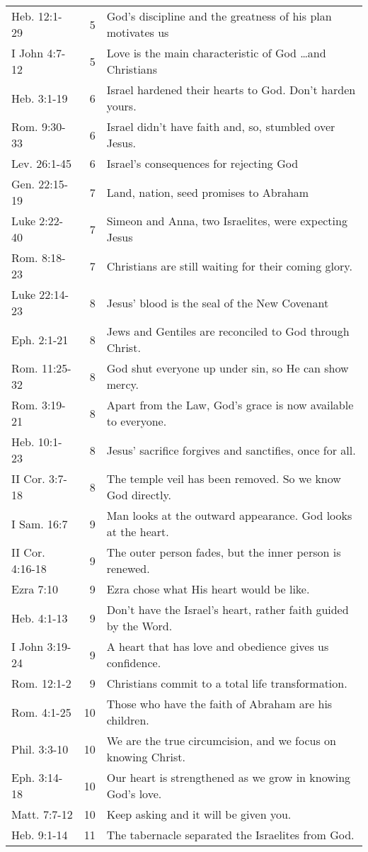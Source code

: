\begin{table}[h]
\begin{tabular}{lrp{11cm}}
Heb. 12:1-29    & 5  & God's discipline and the greatness of his plan motivates us\\
I John 4:7-12   & 5  & Love is the main characteristic of God \ldots and Christians\\
Heb. 3:1-19     & 6  & Israel hardened their hearts to God.  Don't harden yours.\\
Rom. 9:30-33    & 6  & Israel didn't have faith and, so, stumbled over Jesus.\\
Lev. 26:1-45    & 6  & Israel's consequences for rejecting God\\
Gen. 22:15-19   & 7  & Land, nation, seed promises to Abraham\\
Luke 2:22-40    & 7  & Simeon and Anna, two Israelites, were expecting Jesus\\
Rom. 8:18-23    & 7  & Christians are still waiting for their coming glory.\\
Luke 22:14-23   & 8  & Jesus' blood is the seal of the New Covenant\\
Eph. 2:1-21     & 8  & Jews and Gentiles are reconciled to God through Christ.\\
Rom. 11:25-32   & 8  & God shut everyone up under sin, so He can show mercy.\\
Rom. 3:19-21    & 8  & Apart from the Law, God's grace is now available to everyone.\\
Heb. 10:1-23    & 8  & Jesus' sacrifice forgives and sanctifies, once for all.\\
II Cor. 3:7-18  & 8  & The temple veil has been removed.  So we know God directly.\\
I Sam. 16:7     & 9  & Man looks at the outward appearance.  God looks at the heart.\\
II Cor. 4:16-18 & 9  & The outer person fades, but the inner person is renewed.\\
Ezra 7:10       & 9  & Ezra chose what His heart would be like.\\
Heb. 4:1-13     & 9  & Don't have the Israel's heart, rather faith guided by the Word.\\
I John 3:19-24  & 9  & A heart that has love and obedience gives us confidence.\\
Rom. 12:1-2     & 9  & Christians commit to a total life transformation.\\
Rom. 4:1-25     & 10 & Those who have the faith of Abraham are his children.\\
Phil. 3:3-10    & 10 & We are the true circumcision, and we focus on knowing Christ.\\Eph. 3:14-18    & 10 & Our heart is strengthened as we grow in knowing God's love.\\
Matt. 7:7-12    & 10 & Keep asking and it will be given you.\\
Heb. 9:1-14     & 11 & The tabernacle separated the Israelites from God.\\

\bottomrule
\end{tabular}
\label{tab:ScriptureReference}
\end{table}
